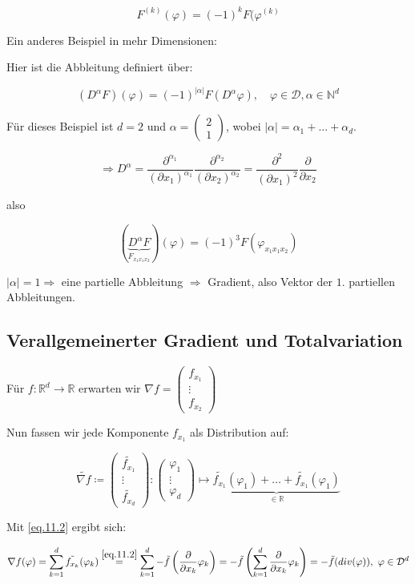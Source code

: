 \documentclass[ngerman]{article}
\theoremstyle{plain}
\theoremstyle{definition}
\numberwithin{equation}{section}
\newcommand{\abs}[1] {
\left| #1 \right|
}
\newcommand{\R}[0] {
\mathbb R
}
\newcommand{\N}[0] {
    \mathbb N
}
\newcommand{\srmatrix}[1] {
\left( \begin{smallmatrix} #1 \end{smallmatrix} \right)
}
\newcommand{\mat}[1] {
\begin{pmatrix} #1 \end{pmatrix}
}
\begin{document}
\[F^{(k)}(\varphi) = (-1)^kF(\varphi^{(k)}\]

Ein anderes Beispiel in mehr Dimensionen:

Hier ist die Abbleitung definiert über:

\[(D^\alpha F)(\varphi) = (-1)^{\abs{\alpha}}F(D^{\alpha} \varphi), \quad \varphi \in \mathcal{D}, \alpha \in \N^d\]

Für dieses Beispiel ist $d=2$ und $\alpha = \mat{2\\1}$, wobei $\abs{\alpha} = \alpha_1 + ... +\alpha_d$.

\[\Rightarrow D^\alpha = \frac{\partial^{\alpha_1}}{(\partial x_1)^{\alpha_1}}\frac{\partial^{\alpha_2}}{(\partial x_2)^{\alpha_2}} = \frac{\partial^{2}}{(\partial x_1)^{2}} \frac{\partial}{\partial x_2}\]

also

\[(\underbrace{D^\alpha F}_{F_{x_1 x_1 x_2}})(\varphi) = (-1)^{3}F(\varphi_{x_1 x_1 x_2})\]

$\abs{\alpha}=1 \Rightarrow $ eine partielle Abbleitung $\Rightarrow$ Gradient, also Vektor der $1.$ partiellen Abbleitungen.

\subsection{Verallgemeinerter Gradient und Totalvariation}

Für $f:\R^d \to \R$ erwarten wir $\nabla f = \srmatrix{f_{x_1} \\ \vdots \\ f_{x_2}}$

Nun fassen wir jede Komponente $f_{x_1}$ als Distribution auf:

\[\tilde{\nabla f} \coloneqq \mat{\tilde{f_{x_1}}\\ \vdots \\ \tilde{f_{x_d}}}: \mat{\varphi_1 \\ \vdots \\ \varphi_d} \mapsto \underbrace{\tilde{f_{x_1}}(\varphi_1) + \hdots + \tilde{f_{x_1}}(\varphi_1)}_{\in \R}\]

Mit \eqref{eq.11.2} ergibt sich:

\begin{equation}\label{eq.11.3}
    \nabla f(\varphi)=\sum_{k=1}^d \tilde{f_{x_k}}(\varphi_k) \overset{\eqref{eq.11.2}}{=} \sum_{k=1}^d - \tilde{f}\left(\frac{\partial}{\partial x_k} \varphi_k \right) = -\tilde{f} \left( \sum_{k=1}^d \frac{\partial}{\partial x_k} \varphi_k \right) = - \tilde f (div(\varphi)), \ \varphi \in \mathcal{D}^d
\end{equation}
\end{document}
